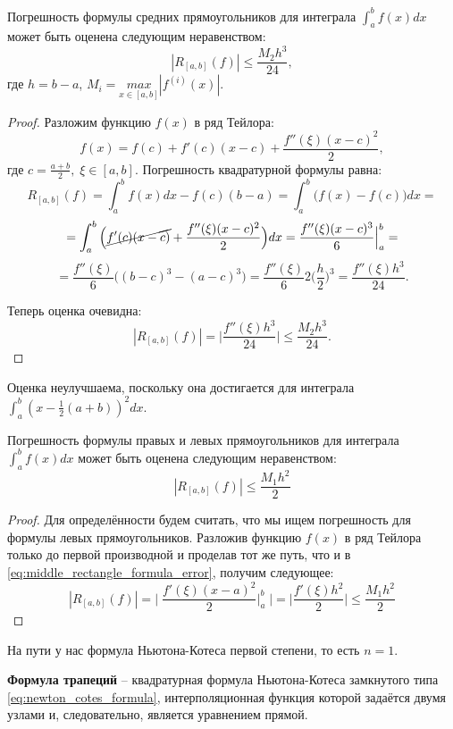 \documentclass[../main.tex]{subfile}
\begin{document}
\begin{theorem}
\label{eq:middle_rectangle_formula_error}
	Погрешность формулы средних прямоугольников для интеграла $\int_a^b
	f(x)dx$ может быть оценена следующим неравенством:
	\[\boxed{|R_{[a,b]}(f)|\le\frac{M_2h^3}{24}},\]
	где $h=b-a$, $M_i=\underset{x\in[a,b]}{max}|f^{(i)}(x)|.$
\end{theorem}

\begin{proof}
	Разложим функцию $f(x)$ в ряд Тейлора:
	\[f(x)=f(c)+f'(c)(x-c)+\frac{f''(\xi)(x-c)^2}{2},\]
	где $c=\frac{a+b}{2},\;\xi\in[a,b].$ Погрешность квадратурной формулы
	равна:
	\[R_{[a,b]}(f)=\int_a^b f(x)dx - f(c)(b-a)=\int_a^b\big(f(x) - f(c)\big)
	dx=\]
	\[=\int_a^b \Big(\cancel{f'(c)(x-c)}+\frac{f''(\xi)(x-c)^2}{2}\Big)dx=
	\frac{f''(\xi)(x-c)^3}{6}\Big|_a^b=\]
	\[=\frac{f''(\xi)}{6}\Big((b-c)^3-(a-c)^3\Big)=\frac{f''(\xi)}{6}2\Big(
	\frac{h}{2}\Big)^3=\frac{f''(\xi)h^3}{24}.\]

	Теперь оценка очевидна:
	\[|R_{[a,b]}(f)|=\Big|\frac{f''(\xi)h^3}{24}\Big|\le\frac{M_2h^3}{24}.\]
\end{proof}

Оценка неулучшаема, поскольку она достигается для интеграла\\
$\int_a^b(x-\frac{1}{2}(a+b))^2dx$.

\begin{theorem}
	Погрешность формулы правых и левых прямоугольников для интеграла
	$\int_a^b f(x)dx$ может быть оценена следующим неравенством:
	\[\boxed{|R_{[a,b]}(f)|\le\frac{M_1h^2}{2}}\]
\end{theorem}

\begin{proof}
	Для определённости будем считать, что мы ищем погрешность для формулы
	левых прямоугольников. Разложив функцию $f(x)$ в ряд Тейлора только до
	первой производной и проделав тот же путь, что и в
	\eqref{eq:middle_rectangle_formula_error}, получим следующее:
	\[|R_{[a,b]}(f)|=\Big|\;\frac{f'(\xi)(x-a)^2}{2}\Big|_a^b\;\Big|=
	\Big|\frac{f'(\xi)h^2}{2}\Big|\le\frac{M_1h^2}{2}\]
\end{proof}

На пути у нас формула Ньютона-Котеса первой степени, то есть $n=1$.

\begin{define}
	\textbf{Формула трапеций} -- квадратурная формула Ньютона-Котеса
	замкнутого типа \eqref{eq:newton_cotes_formula}, интерполяционная
	функция которой задаётся двумя узлами и, следовательно, является
	уравнением прямой.
\end{define}
\end{document}
